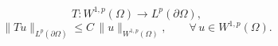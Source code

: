 

\begin{page}
\begin{equation}\label{eq:trace-operator}
T \colon W^{1,p}(\Omega) \to L^p(\partial\Omega),
\end{equation}
\begin{equation}\label{eq:trace-estimate}
\|Tu\|_{L^p(\partial\Omega)} \leq C\,\|u\|_{W^{1,p}(\Omega)},
\qquad \forall\, u \in W^{1,p}(\Omega).
\end{equation}
\end{page}

